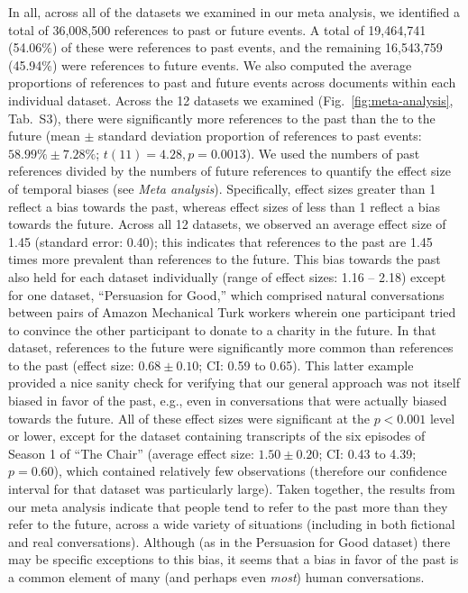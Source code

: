 \documentclass[10pt]{article}
\newcommand{\metaAnalysisDatasets}{S3}
\begin{document}
In all, across all of the datasets we examined in our meta analysis, we identified a total of 36,008,500 references to past or future events. A total of 19,464,741 (54.06\%) of these were references to past events, and the remaining 16,543,759 (45.94\%) were references to future events. We also computed the average proportions of references to past and future events across documents within each individual dataset. Across the 12 datasets we examined (Fig.~\ref{fig:meta-analysis}, Tab.~\metaAnalysisDatasets), there were significantly more references to the past than the to the future (mean $\pm$ standard deviation proportion of references to past events: $58.99\% \pm 7.28\%$; $t(11) = 4.28, p = 0.0013$). We used the numbers of past references divided by the numbers of future references to quantify the effect size of temporal biases (see \textit{Meta analysis}).  Specifically, effect sizes greater than 1 reflect a bias towards the past, whereas effect sizes of less than 1 reflect a bias towards the future.  Across all 12 datasets, we observed an average effect size of 1.45 (standard error: 0.40); this indicates that references to the past are 1.45 times more prevalent than references to the future.  This bias towards the past also held for each dataset individually (range of effect sizes: 1.16 -- 2.18) except for one dataset, ``Persuasion for Good,'' which comprised natural conversations between pairs of Amazon Mechanical Turk workers wherein one participant tried to convince the other participant to donate to a charity in the future. In that dataset, references to the future were significantly more common than references to the past (effect size: $0.68 \pm 0.10$; CI: 0.59 to 0.65). This latter example provided a nice sanity check for verifying that our general approach was not itself biased in favor of the past, e.g., even in conversations that were actually biased towards the future.  All of these effect sizes were significant at the $p < 0.001$ level or lower, except for the dataset containing transcripts of the six episodes of Season 1 of ``The Chair'' (average effect size: $1.50 \pm 0.20$; CI: 0.43 to 4.39; $p = 0.60$), which contained relatively few observations (therefore our confidence interval for that dataset was particularly large).  Taken together, the results from our meta analysis indicate that people tend to refer to the past more than they refer to the future, across a wide variety of situations (including in both fictional and real conversations). Although (as in the Persuasion for Good dataset) there may be specific exceptions to this bias, it seems that a bias in favor of the past is a common element of many (and perhaps even \textit{most}) human conversations.
\end{document}
